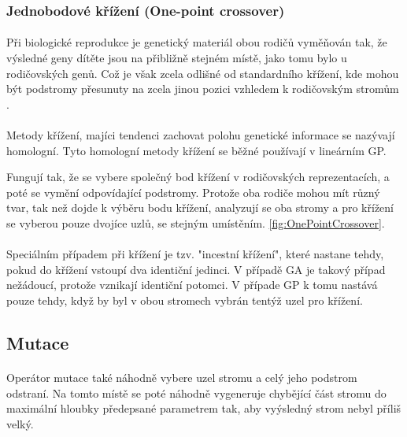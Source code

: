 \documentclass[bc,male,java,dept460]{diploma}		%
\begin{document}
\subsubsection{Jednobodové křížení (One-point crossover)}
\paragraph*{}
Při biologické reprodukce je genetický materiál obou rodičů vyměňován tak, že výsledné geny dítěte jsou na přibližně stejném místě, jako tomu bylo u rodičovských genů. Což je však zcela odlišné od standardního křížení, kde mohou být podstromy přesunuty na zcela jinou pozici vzhledem k rodičovským stromům \cite{langdonpoli}.

\paragraph*{}
Metody křížení, majíci tendenci zachovat polohu genetické informace se nazývají homologní. Tyto homologní metody křížení se běžné používají v lineárním GP.

Fungují tak, že se vybere společný bod křížení v rodičovských reprezentacích, a poté se vymění odpovídající podstromy. Protože oba rodiče mohou mít různý tvar, tak než dojde k výběru bodu křížení, analyzují se oba stromy a pro křížení se vyberou pouze dvojíce uzlů, se stejným umístěním. \ref{fig:OnePointCrossover}.


\paragraph*{}
Speciálním případem při křížení je tzv. "incestní křížení", které nastane tehdy, pokud do křížení vstoupí dva identiční jedinci. V případě GA je takový případ nežádoucí, protože vznikají identiční potomci. V případe GP k tomu nastává pouze tehdy, když by byl v obou stromech vybrán tentýž uzel pro křížení.

\subsection{Mutace}
\paragraph*{}
Operátor mutace také náhodně vybere uzel stromu a celý jeho podstrom odstraní. Na tomto místě se poté náhodně vygeneruje chybějící část stromu do maximální hloubky předepsané parametrem tak, aby vyýsledný strom nebyl příliš velký. 
\end{document}
